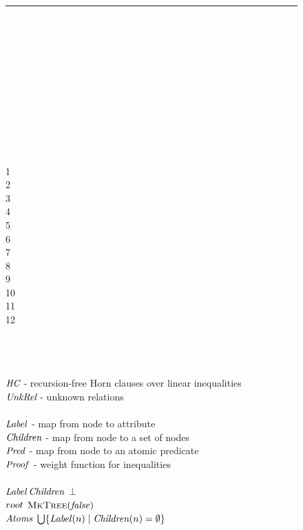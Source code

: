 \linespread{1.2}
\begin{figure}[t]
\hrule
  \centering
  \begin{minipage}[t]{.04\columnwidth}
    \mbox{} \\ \\ \\ \\ \\ \\ \\ \\ \\ \\ \\
    1 \\ 2 \\ 3 \\ 4 \\ 5 \\ 6 \\ 7 \\ 8 \\ 9 \\ 10 \\ 11 \\ 12
  \end{minipage}
  \begin{minipage}[t]{.94\columnwidth}
    \mbox{}\\
    \algFunction \algSolveLinearHornClauses\\
    \algInput \\
    \tabT $\textit{HC}$ - recursion-free Horn clauses over linear inequalities \\
    \tabT $\textit{UnkRel}$ - unknown relations \\
    \algVars\\
    \tabT $\mathit{Label}$ - map from node to attribute \\
    \tabT $\mathit{Children}$ - map from node to a set of nodes \\
    \tabT $\mathit{Pred}$ - map from node to an atomic predicate \\
    \tabT $\mathit{Proof}$ - weight function for inequalities \\
    \algBegin\\
    \tabT $\mathit{Label}$\algAssgn $\mathit{Children}$ \algAssgn $\bot$ \hfill
    \\
    \tabT $root$ \algAssgn $\textsc{MkTree}(\mathit{false})$ \\
    \tabT $\mathit{Atoms}$ \algAssgn $\bigcup\{\mathit{Label}(n) \mid \mathit{Children}(n) = \emptyset\}$\\

\end{minipage}
\end{figure}
